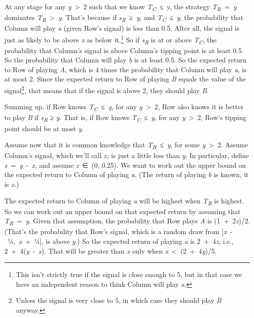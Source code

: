 \documentclass[
  10pt,
  letterpaper,
  twoside]{scrbook}
\begin{document}
At any stage for any \emph{y}~\textgreater~2 such that we know
\emph{T\textsubscript{C}}~≤~y, the strategy
\emph{T\textsubscript{R}}~=~\emph{y} dominates
\emph{T\textsubscript{R}}~\textgreater~\emph{y}. That's because if
\emph{s\textsubscript{R}}~≥~\emph{y}, and
\emph{T\textsubscript{C}}~≤~\emph{y}, the probability that Column will
play \emph{a} (given Row's signal) is less than 0.5. After all, the
signal is just as likely to be above \emph{x} as below it.\footnote{This
  isn't strictly true if the signal is close enough to 5, but in that
  case we have an independent reason to think Column will play \emph{a}.}
So if \emph{s\textsubscript{R}} is at or above
\emph{T\textsubscript{C}}, the probability that Column's signal is above
Column's tipping point is at least 0.5. So the probability that Column
will play \emph{b} is at least 0.5. So the expected return to Row of
playing \emph{A}, which is 4 times the probability that Column will play
\emph{a}, is at most 2. Since the expected return to Row of playing
\emph{B} equals the value of the signal\footnote{Unless the signal is
  very close to 5, in which case they should play \emph{B} anyway.},
that means that if the signal is above 2, they should play \emph{B}.

Summing up, if Row knows \emph{T\textsubscript{C}}~≤~\emph{y}, for any
\emph{y}~\textgreater~2, Row also knows it is better to play \emph{B} if
\emph{s\textsubscript{R}} ≥ \emph{y}. That is, if Row knows
\emph{T\textsubscript{C}}~≤~\emph{y}, for any \emph{y}~\textgreater~2,
Row's tipping point should be at most \emph{y}.

Assume now that it is common knowledge that
\emph{T\textsubscript{R}}~≤~\emph{y}, for some \emph{y}~\textgreater~2.
Assume Column's signal, which we'll call \emph{x}, is just a little less
than \emph{y}. In particular, define \emph{z}~=~\emph{y}~-~\emph{x}, and
assume \emph{z}~∈~(0, 0.25). We want to work out the upper bound on the
expected return to Column of playing \emph{a}. (The return of playing
\emph{b} is known, it is \emph{x}.)

The expected return to Column of playing \emph{a} will be highest when
\emph{T\textsubscript{R}} is highest. So we can work out an upper bound
on that expected return by assuming that
\emph{T\textsubscript{R}}~=~\emph{y}. Given that assumption, the
probability that Row plays \emph{A} is (1~+~2\emph{z})/2. (That's the
probability that Row's signal, which is a random draw from
{[}\emph{x}~-~¼,~\emph{x}~+~¼{]}, is above \emph{y}.) So the expected
return of playing \emph{a} is 2~+~4\emph{z}, i.e.,
2~+~4(\emph{y}~-~\emph{x}). That will be greater than \emph{x} only when
\emph{x}~\textless~(2~+~4\emph{y})/5.
\end{document}
